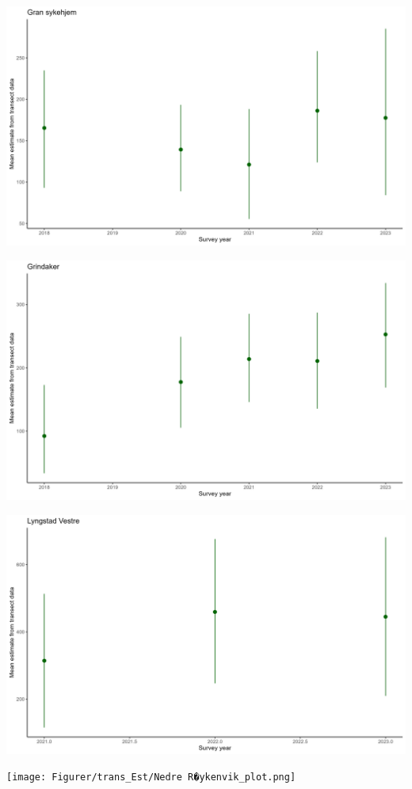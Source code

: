 \documentclass[
  letterpaper,
  DIV=11,
  numbers=noendperiod]{scrreport}
\begin{document}
\includegraphics{Figurer/trans_Est/Gran sykehjem_plot.png}

\includegraphics{Figurer/trans_Est/Grindaker_plot.png}

\includegraphics{Figurer/trans_Est/Lyngstad Vestre_plot.png}

\texttt{[image: Figurer/trans\_Est/Nedre R�ykenvik\_plot.png]}
\end{document}
